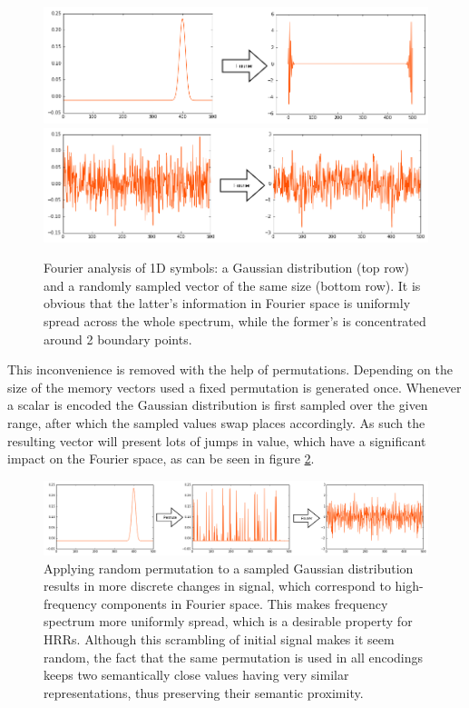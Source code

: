 \documentclass[journal]{journal}
\begin{document}
\begin{figure}[th!]
	\includegraphics[width=\columnwidth]{img/scalar-pre-perm-fft.png}
	\includegraphics[width=\columnwidth]{img/scalar-random-fft.png}
	\caption{Fourier analysis of 1D symbols: a Gaussian distribution (top row) and a randomly sampled vector of the same size (bottom row). It is obvious that the latter's information in Fourier space is uniformly spread across the whole spectrum, while the former's is concentrated around 2 boundary points.}
	\label{fft}
\end{figure}
	
	This inconvenience is removed with the help of permutations.
Depending on the size of the memory vectors used a fixed permutation is generated once.
Whenever a scalar is encoded the Gaussian distribution is first sampled over the given range, after which the sampled values swap places accordingly.
As such the resulting vector will present lots of jumps in value, which have a significant impact on the Fourier space, as can be seen in figure \ref{perm-fft}.
	
	\begin{figure}
		\includegraphics[width=\columnwidth]{img/scalar-perm-step-fft.png}
		\caption{Applying random permutation to a sampled Gaussian distribution results in more discrete changes in signal, which correspond to high-frequency components in Fourier space. This makes frequency spectrum more uniformly spread, which is a desirable property for HRRs. Although this scrambling of initial signal makes it seem random, the fact that the same permutation is used in all encodings keeps two semantically close values having very similar representations, thus preserving their semantic proximity. }
		\label{perm-fft}
	\end{figure}
	
\end{document}

